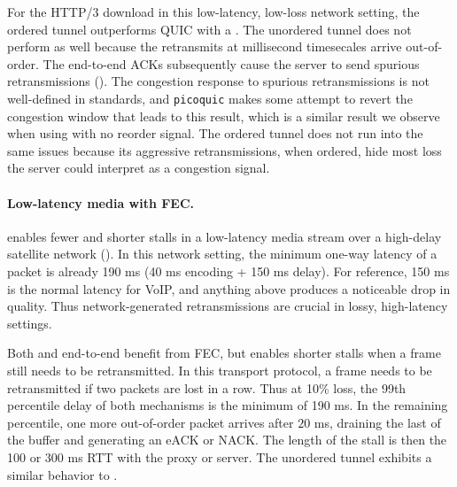 For the HTTP/3 download in this low-latency, low-loss
network setting, the ordered tunnel outperforms QUIC with a \Sys.
The unordered tunnel does not perform as
well because the retransmits at millisecond timesecales arrive out-of-order.
The end-to-end ACKs subsequently cause the server to send spurious
retransmissions (). The congestion response to spurious
retransmissions is not well-defined in standards, and \texttt{picoquic} makes some attempt
to revert the congestion window that leads to this result, which is a similar
result we observe when using \Sys with no reorder signal. The ordered tunnel does
not run into the same issues because its aggressive retransmissions, when
ordered, hide most loss the server could interpret as a congestion signal.

\paragraph{Low-latency media with FEC.}

\Sys enables fewer and shorter stalls in a low-latency media stream over a
high-delay satellite network (). In this network setting,
the minimum one-way latency of a packet is already 190 ms (40 ms encoding + 150 ms delay).
For reference, 150
ms is the normal latency for VoIP, and anything above produces a noticeable
drop in quality. Thus network-generated retransmissions are crucial in lossy, high-latency
settings.

Both \Sys and end-to-end benefit from FEC, but \Sys enables shorter stalls when
a frame still needs to be retransmitted. In this transport protocol, a frame
needs to be retransmitted if two packets are lost in a row. Thus at 10\% loss,
the 99th percentile delay of both mechanisms is the minimum of 190 ms. In the
remaining percentile, one more out-of-order packet arrives after $20$ ms,
draining the last of the buffer and generating an eACK or NACK. The length of
the stall is then the 100 or 300 ms RTT with the proxy or server. The unordered
tunnel exhibits a similar behavior to \Sys.

